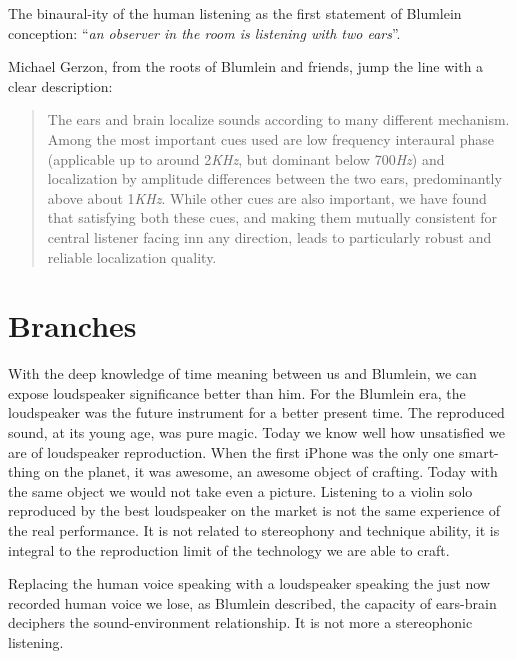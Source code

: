 \documentclass{article}
\begin{document}
The binaural-ity of the human listening as the first statement of Blumlein conception: “\emph{an observer in the room is listening with two ears}”.

Michael Gerzon, from the roots of Blumlein and friends, jump the line with a clear description:

\begin{quotation}
The ears and brain localize sounds according to many different mechanism. Among the most important cues used are low frequency interaural phase (applicable up to around 2\emph{KHz}, but dominant below 700\emph{Hz}) and localization by amplitude differences between the two ears, predominantly above about 1\emph{KHz}. While other cues are also important, we have found that satisfying both these cues, and making them mutually consistent for central listener facing inn any direction, leads to particularly robust and reliable localization quality.\cite{mg92pdmsss}
\end{quotation}

\vfill\null

\newpage

\section{Branches}
\label{sec:branches}

With the deep knowledge of time meaning between us and Blumlein, we can expose loudspeaker significance better than him. For the Blumlein era, the loudspeaker was the future instrument for a better present time. The reproduced sound, at its young age, was pure magic. Today we know well how unsatisfied we are of loudspeaker reproduction. When the first iPhone was the only one smart-thing on the planet, it was awesome, an awesome object of crafting. Today with the same object we would not take even a picture. Listening to a violin solo reproduced by the best loudspeaker on the market is not the same experience of the real performance. It is not related to stereophony and technique ability, it is integral to the reproduction limit of the technology we are able to craft.

Replacing the human voice speaking with a loudspeaker speaking the just now recorded human voice we lose, as Blumlein described, the capacity of ears-brain deciphers the sound-environment relationship. It is not more a stereophonic listening.
\end{document}
